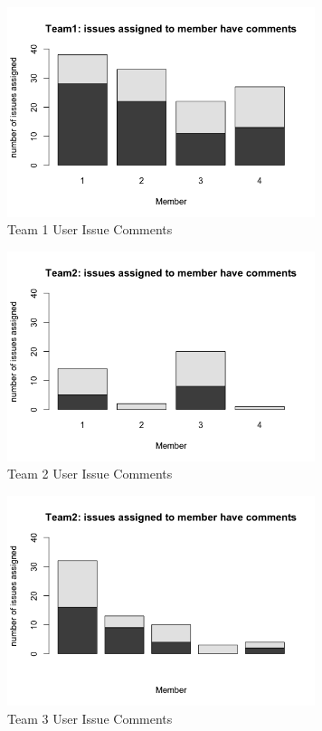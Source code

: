 \documentclass[conference]{IEEEtran}
\begin{document}
\begin{figure}[H]
    \centering
    \includegraphics[width=9cm]{../AprilProject/pic/team1_user_issue_comments.png}
    \caption{Team 1 User Issue Comments}
    \label{team1_issue_comment}
\end{figure}

\begin{figure}[H]
    \centering
    \includegraphics[width=9cm]{../AprilProject/pic/team2_user_issue_comments.png}
    \caption{Team 2 User Issue Comments}
    \label{team2_issue_comment}
\end{figure}

\begin{figure}[H]
    \centering
    \includegraphics[width=9cm]{../AprilProject/pic/team3_user_issue_comments.png}
    \caption{Team 3 User Issue Comments}
    \label{team3_issue_comment}
\end{figure}
\end{document}

